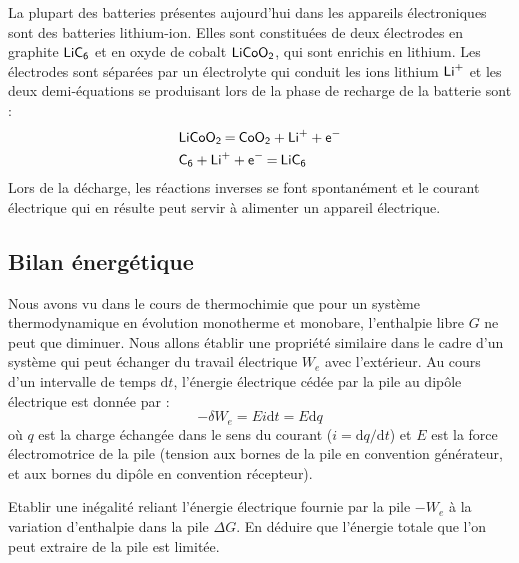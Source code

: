 \documentclass[11pt,fleqn]{book} %
\newcommand{\dd}{\mathrm{d}}
\begin{document}
\begin{encart}
	La plupart des batteries présentes aujourd'hui dans les appareils électroniques sont des batteries lithium-ion. Elles sont constituées de deux électrodes en graphite $\ce{LiC6}$ et en oxyde de cobalt $\ce{LiCoO2}$, qui sont enrichis en lithium. Les électrodes sont séparées par un électrolyte qui conduit les ions lithium $\ce{Li^+}$ et les deux demi-équations se produisant lors de la phase de recharge de la batterie sont :
	\begin{align}
		&\ce{LiCoO2 = CoO2 + Li^+ + e^-} \\
		&\ce{C6 + Li^+ + e^- = LiC6}
	\end{align}
	Lors de la décharge, les réactions inverses se font spontanément et le courant électrique qui en résulte peut servir à alimenter un appareil électrique.
\end{encart}

\subsection{Bilan énergétique}

Nous avons vu dans le cours de thermochimie que pour un système thermodynamique en évolution monotherme et monobare, l'enthalpie libre $G$ ne peut que diminuer. Nous allons établir une propriété similaire dans le cadre d'un système qui peut échanger du travail électrique $W_e$ avec l'extérieur. Au cours d'un intervalle de temps $\dd t$, l'énergie électrique cédée par la pile au dipôle électrique est donnée par :
\begin{equation}
	-\delta W_e = E i \dd t = E \dd q
\end{equation}
où $q$ est la charge échangée dans le sens du courant ($i = \dd q / \dd t$) et $E$ est la force électromotrice de la pile (tension aux bornes de la pile en convention générateur, et aux bornes du dipôle en convention récepteur).

\begin{capex}
	Etablir une inégalité reliant l'énergie électrique fournie par la pile $-W_e$ à la variation d'enthalpie dans la pile $\Delta G$. En déduire que l'énergie totale que l'on peut extraire de la pile est limitée.
\end{capex}
\end{document}
